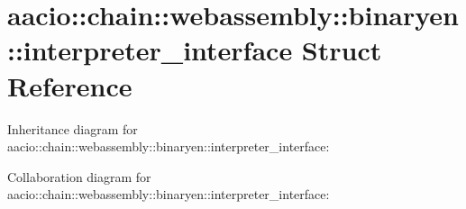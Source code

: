 \hypertarget{structaacio_1_1chain_1_1webassembly_1_1binaryen_1_1interpreter__interface}{}\section{aacio\+:\+:chain\+:\+:webassembly\+:\+:binaryen\+:\+:interpreter\+\_\+interface Struct Reference}
\label{structaacio_1_1chain_1_1webassembly_1_1binaryen_1_1interpreter__interface}


Inheritance diagram for aacio\+:\+:chain\+:\+:webassembly\+:\+:binaryen\+:\+:interpreter\+\_\+interface\+:


Collaboration diagram for aacio\+:\+:chain\+:\+:webassembly\+:\+:binaryen\+:\+:interpreter\+\_\+interface\+:
